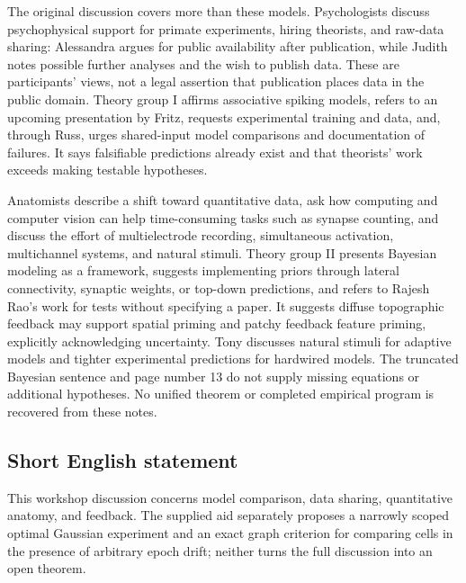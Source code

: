 \documentclass[11pt]{article}
\begin{document}
The original discussion covers more than these models. Psychologists discuss psychophysical support for primate experiments, hiring theorists, and raw-data sharing: Alessandra argues for public availability after publication, while Judith notes possible further analyses and the wish to publish data. These are participants' views, not a legal assertion that publication places data in the public domain. Theory group I affirms associative spiking models, refers to an upcoming presentation by Fritz, requests experimental training and data, and, through Russ, urges shared-input model comparisons and documentation of failures. It says falsifiable predictions already exist and that theorists' work exceeds making testable hypotheses.

Anatomists describe a shift toward quantitative data, ask how computing and computer vision can help time-consuming tasks such as synapse counting, and discuss the effort of multielectrode recording, simultaneous activation, multichannel systems, and natural stimuli. Theory group II presents Bayesian modeling as a framework, suggests implementing priors through lateral connectivity, synaptic weights, or top-down predictions, and refers to Rajesh Rao's work for tests without specifying a paper. It suggests diffuse topographic feedback may support spatial priming and patchy feedback feature priming, explicitly acknowledging uncertainty. Tony discusses natural stimuli for adaptive models and tighter experimental predictions for hardwired models. The truncated Bayesian sentence and page number 13 do not supply missing equations or additional hypotheses. No unified theorem or completed empirical program is recovered from these notes.
\subsection{Short English statement}
This workshop discussion concerns model comparison, data sharing, quantitative anatomy, and feedback. The supplied aid separately proposes a narrowly scoped optimal Gaussian experiment and an exact graph criterion for comparing cells in the presence of arbitrary epoch drift; neither turns the full discussion into an open theorem.
\end{document}

